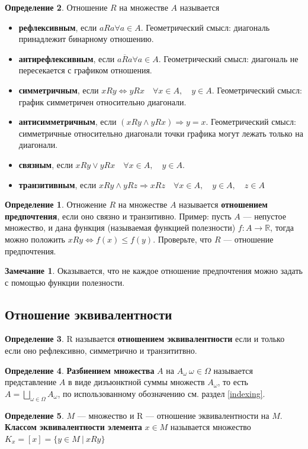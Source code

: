 \documentclass[12pt,oneside]{article}
\theoremstyle{definition}
\newtheorem{definition}{Определение}
\newtheorem{remark}{Замечание}[section]
\begin{document}
\begin{definition}
Отношение $R$ на множестве $A$ называется 
\begin{itemize}
    \item \textbf{рефлексивным}, если $aRa \forall a\in A$. Геометрический смысл: диагональ принадлежит бинарному отношению.
    \item \textbf{антирефлексивным}, если $a\overline{R}a \forall a\in A$. Геометрический смысл: диагональ не пересекается с графиком отношения.
    \item \textbf{симметричным}, если $xRy \Longleftrightarrow yRx \quad \forall x\in A,\quad y\in A$. Геометрический смысл: график симметричен относительно диагонали.
    \item \textbf{антисимметричным}, если $(xRy \wedge yRx) \Longrightarrow y=x$. Геометрический смысл: симметричные относительно диагонали точки графика могут лежать только на диагонали.
    \item \textbf{связным}, если $xRy \vee yRx\quad \forall x\in A,\quad y\in A$. 
    \item \textbf{транзитивным}, если $xRy\wedge yRz \Longrightarrow xRz\quad \forall x\in A,\quad y\in A,\quad z\in A$
\end{itemize}

\begin{definition}
Отножение $R$ на множестве $A$ называется \textbf{отношением предпочтения}, если оно связно и транзитивно. Пример: пусть $A$ --- непустое множество, и дана функция (называемая функцией полезности) $f\colon A\to\mathbb{R}$, тогда можно положить $xRy\iff f(x)\leq f(y)$. Проверьте, что $R$ --- отношение предпочтения.
\end{definition}

\begin{remark}
Оказывается, что не каждое отношение предпочтения можно задать с помощью функции полезности.
\end{remark}

\end{definition}


\subsection{Отношение эквивалентности}
\begin{definition}
R называется \textbf{отношением эквивалентности} если и только если оно рефлексивно, симметрично и транзититвно.
\end{definition}
\begin{definition}
\textbf{Разбиением множества} $A$ на $A_{\omega} \  \omega \in \Omega$ называется представление $A$ в виде дизъюнктной суммы множеств $A_\omega$, то есть $A = \displaystyle\bigsqcup_{\omega \in \Omega} A_{\omega} $, по использованному обозначению см. раздел \ref{indexing}.
\end{definition}
\begin{definition}
$M$ --- множество и R --- отношение эквивалентности на $M$. \textbf{Классом эквивалентности элемента} $x\in M$ называется множество $K_{x} = [x] = \{y\in M\ |\ x
Ry\}$
\end{definition}
\end{document}
